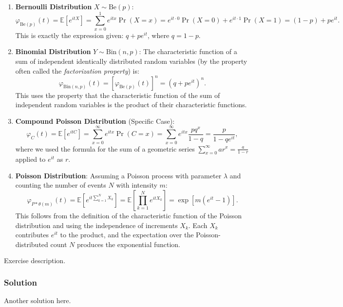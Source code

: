 \documentclass{article}
\begin{document}
\begin{enumerate}[label=(\alph*)]
    \item 
    \textbf{Bernoulli Distribution} \(X \sim \text{Be}(p)\):
    \[
    \varphi_{\text{Be}(p)}(t) = \mathbb{E}[e^{itX}] = \sum_{x=0}^1 e^{itx} \Pr(X = x) = e^{it \cdot 0} \Pr(X=0) + e^{it \cdot 1} \Pr(X=1) = (1-p) + pe^{it}.
    \]
    This is exactly the expression given: \(q + p e^{it}\), where \(q = 1-p\).
    
    \item 
    \textbf{Binomial Distribution} \(Y \sim \text{Bin}(n,p)\):
    The characteristic function of a sum of independent identically distributed random variables (by the property often called the \emph{factorization property}) is:
    \[
    \varphi_{\text{Bin}(n,p)}(t) = [\varphi_{\text{Be}(p)}(t)]^n = (q + pe^{it})^n.
    \]
    This uses the property that the characteristic function of the sum of independent random variables is the product of their characteristic functions.
    
    \item 
    \textbf{Compound Poisson Distribution} (Specific Case):
    \[
    \varphi_{C}(t) = \mathbb{E}[e^{itC}] = \sum_{x=0}^\infty e^{itx} \Pr(C = x) = \sum_{x=0}^\infty e^{itx} \frac{p q^x}{1-q} = \frac{p}{1-qe^{it}},
    \]
    where we used the formula for the sum of a geometric series \(\sum_{x=0}^\infty ar^x = \frac{a}{1-r}\) applied to \(e^{it}\) as \(r\).
    
    \item 
    \textbf{Poisson Distribution}:
    Assuming a Poisson process with parameter \(\lambda\) and counting the number of events \(N\) with intensity \(m\):
    \[
    \varphi_{P \ast \theta(m)}(t) = \mathbb{E}\left[e^{it \sum_{k=1}^N X_k}\right] = \mathbb{E}\left[\prod_{k=1}^N e^{itX_k}\right] = \exp\left[m(e^{it} - 1)\right].
    \]
    This follows from the definition of the characteristic function of the Poisson distribution and using the independence of increments \(X_k\). Each \(X_k\) contributes \(e^{it}\) to the product, and the expectation over the Poisson-distributed count \(N\) produces the exponential function.
    
\end{enumerate}

\exercise
Exercise description.
\subsubsection*{Solution}
Another solution here.
\end{document}
